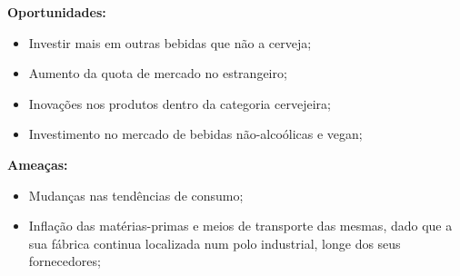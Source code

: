 \noindent \textbf{Oportunidades:}

\begin{itemize}
\item Investir mais em outras bebidas que não a cerveja; 

\item Aumento da quota de mercado no estrangeiro; 

\item Inovações nos produtos dentro da categoria cervejeira; 

\item Investimento no mercado de bebidas não-alcoólicas e vegan; 
\end{itemize}

\noindent \textbf{Ameaças:}
\begin{itemize}
    
\item Mudanças nas tendências de consumo; 

\item Inflação das matérias-primas e meios de transporte das mesmas, dado que a sua fábrica continua localizada num polo industrial, longe dos seus fornecedores; 
\end{itemize}
